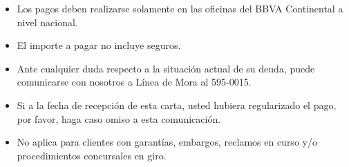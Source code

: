 \vspace{1cm}
\begin{itemize}
  \item {\footnotesize Los pagos deben realizarse solamente en las oficinas del BBVA Continental a nivel nacional.}
  \item {\footnotesize El importe a pagar no incluye seguros.}
  \item {\footnotesize Ante cualquier duda respecto a la situación actual de su deuda, puede comunicarse con nosotros a Línea de Mora al 595-0015.}
  \item {\footnotesize Si a la fecha de recepción de esta carta, usted hubiera regularizado el pago, por favor, haga caso omiso a esta comunicación.}
  \item {\footnotesize No aplica para clientes con garantías, embargos, reclamos en curso y/o procedimientos concursales en giro.}
\end{itemize} 

